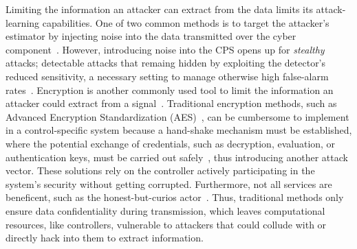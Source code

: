 \documentclass[journal, twoside, web]{ieeecolorpreprint}
\begin{document}

Limiting the information an attacker can extract from the data limits its attack-learning capabilities. One of two common methods is to target the attacker's estimator by injecting noise into the data transmitted over the cyber component~\cite{sandberg2015,cortes2016,Hassan2020}. However, introducing noise into the CPS opens up for \emph{stealthy} attacks; detectable attacks that remaing hidden by exploiting the detector's reduced sensitivity, a necessary setting to manage otherwise high false-alarm rates~\cite{giraldo2018}. Encryption is another commonly used tool to limit the information an attacker could extract from a signal~\cite{kim2022dynamic}. Traditional encryption methods, such as Advanced Encryption Standardization (AES)~\cite{AES2001}, can be cumbersome to implement in a control-specific system because a hand-shake mechanism must be established, where the potential exchange of credentials, such as decryption, evaluation, or authentication keys, must be carried out safely~\cite{kogiso2018}, thus introducing another attack vector. 
These solutions rely on the controller actively participating in the system's security without getting corrupted. Furthermore, not all services are beneficent, such as the honest-but-curios actor~\cite{Boenisch2023}. Thus, traditional methods only ensure data confidentiality during transmission, which leaves computational resources, like controllers, vulnerable to attackers that could collude with or directly hack into them to extract information.
\end{document}
